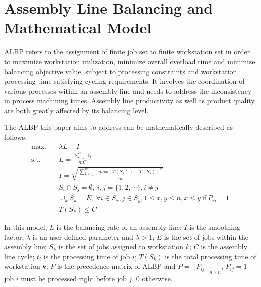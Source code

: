 \section{Assembly Line Balancing and Mathematical Model}

ALBP refers to the assignment of finite job set to finite workstation set in order to maximize workstation utilization, minimize overall overload time and minimize balancing objective value, subject to processing constraints and workstation processing time satisfying cycling requirements.
It involves the coordination of various processes within an assembly line and needs to address the inconsistency in process machining times.
Assembly line productivity as well as product quality are both greatly affected by its balancing level.

The ALBP this paper aims to address can be mathematically described as follows:
\begin{align}
	\text{max.} \quad & \lambda L - I \\
	\text{s.t.} \quad & L = \frac{\sum_{i=1}^{n} t_i}{mC} \\
	& I = \sqrt{\frac{\sum_{k=1}^{m} (max(T(S_k)) - T(S_k))^2}{m}} \\
	& S_i \cap S_j = \emptyset, \ i, j = \{1, 2, \cdots\}, i \neq j \\
	& \cup_k S_k = E, \ \forall i \in S_x, j \in S_y, 1 \leq x, y \leq n, x \leq y \  \text{if} \  P_{ij} = 1 \\
	& T(S_k) \leq C 
\end{align}

In this model, $L$ is the balancing rate of an assembly line; $I$ is the smoothing factor; $\lambda$ is an user-defined parameter and $\lambda > 1$; $E$ is the set of jobs within the assembly line; $S_k$ is the set of jobs assigned to workstation $k$; $C$ is the assembly line cycle; $t_i$ is the processing time of job $i$; $T(S_k)$ is the total processing time of workstation $k$; $P$ is the precedence matrix of ALBP and $P = [P_{ij}]_{n\times n}$, $P_{ij} = 1$ job $i$ must be processed right before job $j$, 0 otherwise.